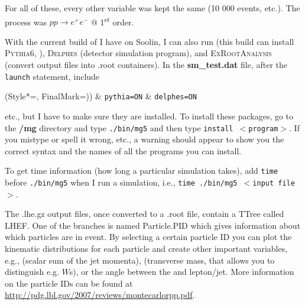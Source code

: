 For all of these, every other variable was kept the same (10 000 events, etc.). The process was $pp \rightarrow e^+ e^-$ @ 1\textsuperscript{st} order.

With the current build of \madgraph I have on Soolin, I can also run \PYTHIA (this build can install \textsc{Pythia6}, \cite{Sjostrand:2007pythia}), \textsc{Delphes} \cite{Ovyn:2009delphes} (detector simulation program), and \textsc{ExRootAnalysis} (convert output files into .root containers). In the \textbf{sm\_test.dat} file, after the \texttt{launch} statement, include

\begin{easylist}
\ListProperties(Style*=, FinalMark={)})
& \texttt{pythia=ON}
& \texttt{delphes=ON}
\end{easylist}

etc., but I have to make sure they are installed. To install these packages, go to the \textbf{/mg} directory and type \texttt{./bin/mg5} and then type \texttt{install $<$program$>$}. If you mistype or spell it wrong, etc., a warning should appear to show you the correct syntax and the names of all the programs you can install.

To get time information (how long a particular simulation takes), add \texttt{time} before \texttt{./bin/mg5} when I run a simulation, i.e., \texttt{time ./bin/mg5 $<$input file$>$}.

The .lhe.gz output files, once converted to a .root file, contain a TTree called LHEF. One of the branches is named Particle.PID which gives information about which particles are in event. By selecting a certain particle ID you can plot the kinematic distributions for each particle and create other important variables, e.g., \HT (scalar sum of the jet momenta), \mT (transverse mass, that allows you to distinguish e.g. $W$s), or the angle between the \etmiss and lepton/jet. More information on the particle IDs can be found at \url{http://pdg.lbl.gov/2007/reviews/montecarlorpp.pdf}.

